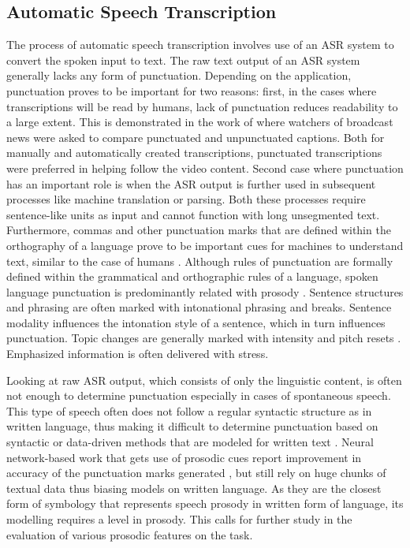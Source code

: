 \subsection{Automatic Speech Transcription}
The process of automatic speech transcription involves use of an ASR system to convert the spoken input to text. The raw text output of an ASR system generally lacks any form of punctuation. Depending on the application, punctuation proves to be important for two reasons: first, in the cases where transcriptions will be read by humans, lack of punctuation reduces readability to a large extent. This is demonstrated in the work of \cite{Tundik2018} where watchers of broadcast news were asked to compare punctuated and unpunctuated captions. Both for manually and automatically created transcriptions, punctuated transcriptions were preferred in helping follow the video content. Second case where punctuation has an important role is when the ASR output is further used in subsequent processes like machine translation or parsing. Both these processes require sentence-like units as input and cannot function with long unsegmented text. Furthermore, commas and other punctuation marks that are defined within the orthography of a language prove to be important cues for machines to understand text, similar to the case of humans \citep{Cho2017NMTbasedSA, Jones:1994:ERP:991886.991960}. Although rules of punctuation are formally defined within the grammatical and orthographic rules of a language, spoken language punctuation is predominantly related with prosody \citep{wallace}. Sentence structures and phrasing are often marked with intonational phrasing and breaks. Sentence modality influences the intonation style of a sentence, which in turn influences punctuation. Topic changes are generally marked with intensity and pitch resets \citep{Farrus:SP:2016}. Emphasized information is often delivered with stress. 

Looking at raw ASR output, which consists of only the linguistic content, is often not enough to determine punctuation especially in cases of spontaneous speech. This type of speech often does not follow a regular syntactic structure as in written language, thus making it difficult to determine punctuation based on syntactic or data-driven methods that are modeled for written text \citep{ballesterosneural}. Neural network-based work that gets use of prosodic cues report improvement in accuracy of the punctuation marks generated \citep{tilk2016bidirectional}, but still rely on huge chunks of textual data thus biasing models on written language. As they are the closest form of symbology that represents speech prosody in written form of language, its modelling requires a level in prosody. This calls for further study in the evaluation of various prosodic features on the task.  

